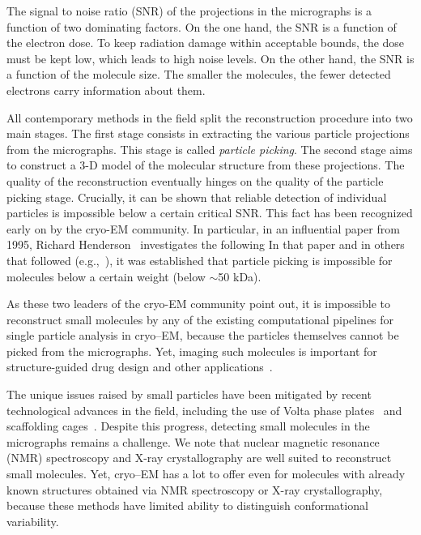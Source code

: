 \documentclass[12pt]{article}
\newcommand{\1}{\mathbf{1}}
\theoremstyle{plain}
\theoremstyle{definition}
\theoremstyle{remark}
\theoremstyle{plain}
\theoremstyle{remark}
\theoremstyle{plain}
\theoremstyle{plain}
\begin{document}
The signal to noise ratio (SNR) of the projections in the micrographs is a function of two dominating factors. On the one hand, the SNR is a function of the electron dose. To keep radiation damage within acceptable bounds, the dose must be kept low, which leads to high noise levels. On the other hand, the SNR is a function of the molecule size. The smaller the molecules, the fewer detected electrons carry information about them.


All contemporary methods in the field split the reconstruction procedure into two main  stages.
The first stage consists in extracting the various particle projections from the micrographs. This stage is called \emph{particle picking}. The second stage aims to construct a 3-D model of the molecular structure from these projections. The quality of the reconstruction eventually hinges on the quality of the particle picking stage.
Crucially, it can be shown that reliable detection of individual particles is impossible below a certain critical SNR. This fact has been recognized early on by the cryo-EM community. In particular, in an influential paper from 1995, Richard Henderson~\cite{henderson1995limitations} investigates the following 
In that paper and in others that followed (e.g.,~\cite{glaeser1999electron}), it was established that particle picking is impossible for molecules below a certain weight (below $\sim$50 kDa). 

As these two leaders of the cryo-EM community point out, it is impossible to reconstruct small molecules by any of the existing computational pipelines for single particle analysis in cryo--EM, because the particles themselves cannot be picked from the micrographs. Yet, imaging such molecules is important for structure-guided drug design and other applications~\cite{scapin2018cryo}.



The unique issues raised by small particles have been mitigated by recent technological advances in the field, including the use of Volta phase plates~\cite{khoshouei2017cryo,liang2017phase} and scaffolding cages~\cite{liu2018nearatomic}.
Despite this progress, detecting small molecules in the micrographs remains a challenge.
We note that nuclear magnetic resonance (NMR) spectroscopy and X-ray crystallography are well suited to reconstruct small molecules. Yet, cryo--EM has a lot to offer even for molecules with already known structures obtained via NMR spectroscopy or X-ray crystallography, because these methods have limited ability to distinguish conformational variability.  
\end{document}
